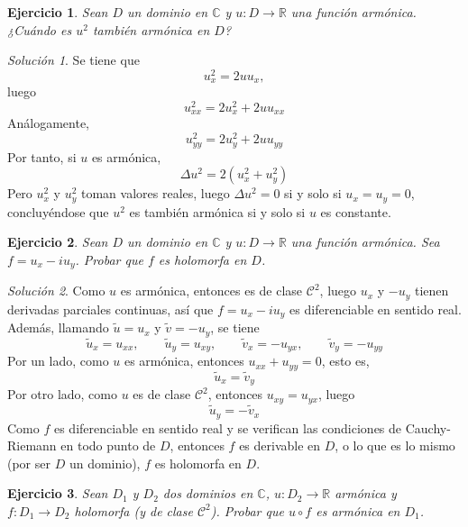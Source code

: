 \documentclass[11pt]{report}
\newcommand{\R}{\mathbb R}
\newcommand{\C}{\mathbb C}
\newtheorem{exercise}{Ejercicio}
\theoremstyle{remark}
\newtheorem*{resolution}{Solución}
\begin{document}
\begin{exercise}
\label{ex6}
Sean $D$ un dominio en $\C$ y $u \colon D \to \R$ una función armónica. ¿Cuándo es $u^2$ también armónica en $D$?
\end{exercise}

\begin{resolution}
Se tiene que
\[u^2_x = 2uu_x,\]
luego
\[u^2_{xx} = 2u_x^2+2uu_{xx}\]
Análogamente,
\[u^2_{yy} = 2u_y^2+2uu_{yy}\]
Por tanto, si $u$ es armónica,
\[\Delta u^2 = 2(u_x^2+u_y^2)\]
Pero $u_x^2$ y $u_y^2$ toman valores reales, luego $\Delta u^2 = 0$ si y solo si $u_x = u_y = 0$, concluyéndose que $u^2$ es también armónica si y solo si $u$ es constante.
\end{resolution}

\begin{exercise}
Sean $D$ un dominio en $\C$ y $u \colon D \to \R$ una función armónica. Sea $f = u_x - iu_y$. Probar que $f$ es holomorfa en $D$.
\end{exercise}

\begin{resolution}
Como $u$ es armónica, entonces es de clase $\mathcal{C}^2$, luego $u_x$ y $-u_y$ tienen derivadas parciales continuas, así que $f = u_x-iu_y$ es diferenciable en sentido real. Además, llamando $\widetilde{u} = u_x$ y $\widetilde{v} = -u_y$, se tiene
\[\widetilde{u}_x = u_{xx}, \qquad \widetilde{u}_y = u_{xy}, \qquad \widetilde{v}_x = -u_{yx}, \qquad \widetilde{v}_y = - u_{yy}\]
Por un lado, como $u$ es armónica, entonces $u_{xx}+u_{yy} = 0$, esto es,
\[\widetilde{u}_x = \widetilde{v}_y\]
Por otro lado, como $u$ es de clase $\mathcal{C}^2$, entonces $u_{xy} = u_{yx}$, luego
\[\widetilde{u}_y = -\widetilde{v}_x\]
Como $f$ es diferenciable en sentido real y se verifican las condiciones de Cauchy-Riemann en todo punto de $D$, entonces $f$ es derivable en $D$, o lo que es lo mismo (por ser $D$ un dominio), $f$ es holomorfa en $D$.
\end{resolution}

\begin{exercise}
Sean $D_1$ y $D_2$ dos dominios en $\C$, $u \colon D_2 \to \R$ armónica y $f \colon D_1 \to D_2$ holomorfa (y de clase $\mathcal{C}^2$). Probar que $u \circ f$ es armónica en $D_1$.
\end{exercise}
\end{document}

